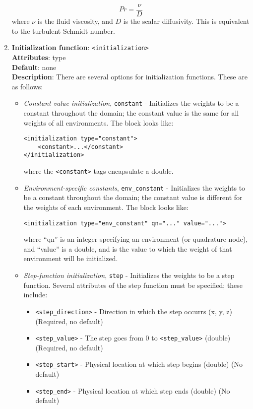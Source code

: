 \begin{enumerate}
\begin{equation}
Pr = \dfrac{\nu}{D}
\end{equation}
where $\nu$ is the fluid viscosity, and $D$ is the scalar diffusivity.  This is equivalent to the turbulent Schmidt number.
%
\item {\bf Initialization function}: \verb=<initialization>= \\
{\bf Attributes}: type \\
{\bf Default}: none \\
{\bf Description}: There are several options for initialization functions. These are as follows:
\begin{itemize}
\item {\it Constant value initialization}, \verb=constant= - Initializes the weights to be a constant throughout the domain; the constant value is the same for all weights of all environments. The block looks like:
\begin{Verbatim}
<initialization type="constant">
	<constant>...</constant>
</initialization>
\end{Verbatim}
where the \verb=<constant>= tags encapsulate a double.
\item {\it Environment-specific constants}, \verb=env_constant= - Initializes the weights to be a constant throughout the domain; the constant value is different for the weights of each environment. The block looks like:
\begin{Verbatim}
<initialization type="env_constant" qn="..." value="...">
\end{Verbatim}
where ``qn'' is an integer specifying an environment (or quadrature node), and ``value'' is a double, and is the value to which the weight of that environment will be initialized.
\item {\it Step-function initialization}, \verb=step= - Initializes the weights to be a step function. Several attributes of the step function must be specified; these include:
	\begin{itemize}
	\item \verb=<step_direction>= - Direction in which the step occurrs (x, y, z) (Required, no default)
	\item \verb=<step_value>= - The step goes from 0 to \verb=<step_value>= (double) (Required, no default)
	\item \verb=<step_start>= - Physical location at which step begins (double) (No default)
	\item \verb=<step_end>= - Physical location at which step ends (double) (No default)

\end{itemize}
\end{itemize}
\end{enumerate}
